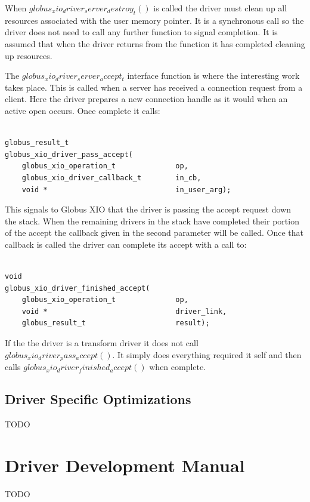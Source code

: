 \documentclass[11pt]{article}
\begin{document}
When $globus_xio_driver_server_destroy_t()$ is called the driver must clean
up all resources associated with the user memory pointer.  It is a 
synchronous call so the driver does not need to call any further function
to signal completion.  It is assumed that when the driver returns from the
function it has completed cleaning up resources.

The $globus_xio_driver_server_accept_t$ interface function is where the 
interesting work takes place.  This is called when a server has received
a connection request from a client.  Here the driver prepares a new 
connection handle as it would when an active open occurs.  Once complete
it calls:

\begin{verbatim}

globus_result_t
globus_xio_driver_pass_accept(
    globus_xio_operation_t              op,
    globus_xio_driver_callback_t        in_cb,
    void *                              in_user_arg);

\end{verbatim}

This signals to Globus XIO that the driver is passing the accept request
down the stack.  When the remaining drivers in the stack have completed
their portion of the accept the callback given in the second parameter
will be called.  Once that callback is called the driver can complete
its accept with a call to:

\begin{verbatim}

void
globus_xio_driver_finished_accept(
    globus_xio_operation_t              op,
    void *                              driver_link,
    globus_result_t                     result);

\end{verbatim}

If the the driver is a transform driver it does not call 
$globus_xio_driver_pass_accept()$.  It simply does everything required 
it self and then calls $globus_xio_driver_finished_accept()$ when complete.

\subsection{Driver Specific Optimizations}
TODO

\section{Driver Development Manual}
TODO
\end{document}
